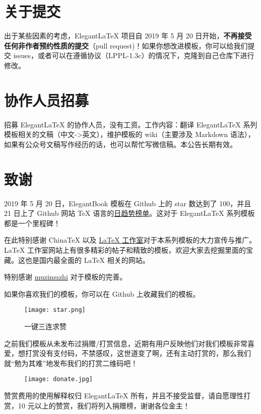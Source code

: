 	\section{关于提交}
	出于某些因素的考虑，Elegant\LaTeX{} 项目自 2019 年 5 月 20 日开始，\textbf{不再接受任何非作者预约性质的提交}（pull request)！如果你想改进模板，你可以给我们提交 issues，或者可以在遵循协议（LPPL-1.3c）的情况下，克隆到自己仓库下进行修改。
	
	\section{协作人员招募}
	招募 Elegant\LaTeX{} 的协作人员，没有工资。工作内容：翻译 Elegant\LaTeX{} 系列模板相关的文稿（中文->英文），维护模板的 wiki（主要涉及 Markdown 语法），如果有公众号文稿写作经历的话，也可以帮忙写微信稿。本公告长期有效。
	
	\section{致谢}
	2019 年 5 月 20 日，ElegantBook 模板在 Github 上的 star 数达到了 100，并且 21 日上了 Github 网站 \TeX{} 语言的\href{https://github.com/trending/tex?since=daily}{日趋势榜单}。这对于 Elegant\LaTeX{} 系列模板都是一个里程碑！
	
	在此特别感谢 China\TeX{} 以及 \href{http://www.latexstudio.net/}{\LaTeX{} 工作室}对于本系列模板的大力宣传与推广。\LaTeX{} 工作室网站上有很多精彩的帖子和精致的模板，欢迎大家去挖掘里面的宝藏。这也是国内最全面的 \LaTeX{} 相关的网站。
	
	特别感谢 \href{https://github.com/muzimuzhi}{muzimuzhi} 对于模板的完善。
	
	如果你喜欢我们的模板，你可以在 Github 上收藏我们的模板。
	\begin{figure}[htbp]
	\centering
	\texttt{[image: star.png]}
	\caption{一键三连求赞}
	\end{figure}
	
	之前我们模板从未发布过捐赠/打赏信息，近期有用户反映他们对我们模板非常喜爱，想打赏没有支付码，不禁感叹，这世道变了啊，还有主动打赏的，那么我们就“勉为其难”地发布我们的打赏二维码吧！
	
	\begin{figure}[htbp]
	\centering
	\texttt{[image: donate.jpg]}
	\end{figure}
	
	赞赏费用的使用解释权归 Elegant\LaTeX{} 所有，并且不接受监督，请自愿理性打赏，10 元以上的赞赏，我们将列入捐赠榜，谢谢各位金主！
	
